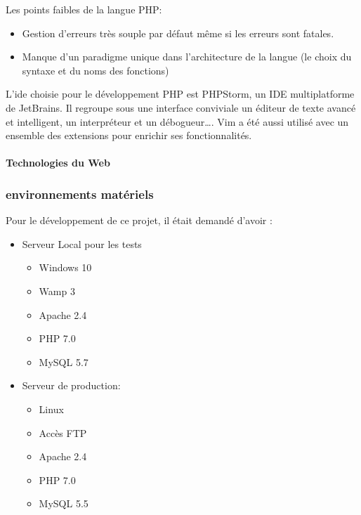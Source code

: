Les points faibles de la langue PHP:
\begin{itemize}
    \item Gestion d'erreurs très souple par défaut même si les erreurs sont
        fatales.
    \item Manque d'un paradigme unique dans l'architecture de la langue (le
        choix du syntaxe et du noms des fonctions)
\end{itemize}

L'ide choisie pour le développement PHP est PHPStorm, un IDE multiplatforme de
JetBrains. Il regroupe sous une interface conviviale un éditeur de
texte avancé et intelligent, un interpréteur et un débogueur\ldots.
Vim a été aussi utilisé avec un ensemble des extensions pour enrichir ses
fonctionnalités.

%

\paragraph{Technologies du Web}


\subsubsection{environnements matériels}

Pour le développement de ce projet, il était demandé d'avoir :
\begin{itemize}
 \item Serveur Local pour les tests
     \begin{itemize}
         \item Windows 10
         \item Wamp 3
         \item Apache 2.4
         \item PHP 7.0
         \item MySQL 5.7
     \end{itemize}
 \item Serveur de production:
     \begin{itemize}
      \item Linux
      \item Accès FTP
      \item Apache 2.4
      \item PHP 7.0
      \item MySQL 5.5
     \end{itemize}
\end{itemize}

